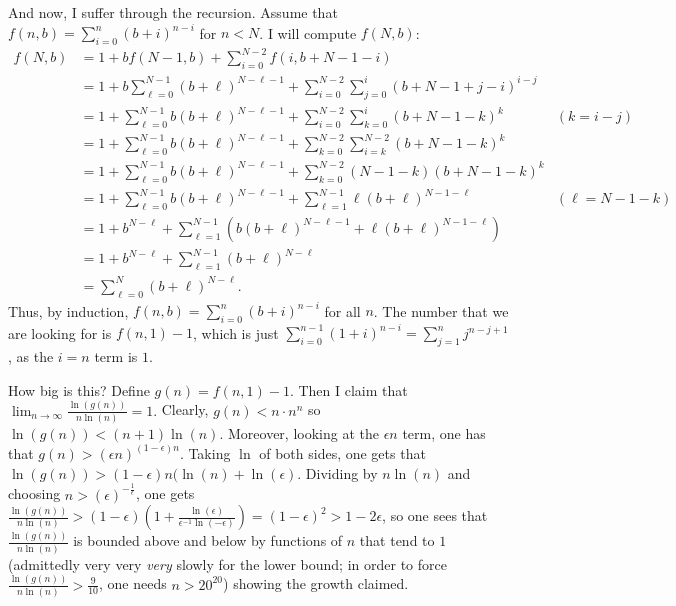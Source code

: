 \documentclass[11pt]{article}
\theoremstyle{definition}
\begin{document}
And now, I suffer through the recursion.  Assume that $f(n, b) = \displaystyle{\sum_{i = 0}^{n}} (b+i)^{n-i}$ for $n < N$.  I will compute $f(N, b)$:
\begin{align*}
f(N, b) & = 1 + bf(N-1, b) + \sum_{i = 0}^{N-2} f(i, b+N-1-i) \\
& = 1 + b\sum_{\ell = 0}^{N-1}(b+\ell)^{N-\ell-1} + \sum_{i = 0}^{N-2} \sum_{j = 0}^{i}(b+N-1+j-i)^{i-j} \\
& = 1 + \sum_{\ell = 0}^{N-1}b(b+\ell)^{N-\ell-1} + \sum_{i = 0}^{N-2} \sum_{k = 0}^{i}(b+N-1-k)^{k} & (k = i-j) \\
& = 1 + \sum_{\ell = 0}^{N-1}b(b+\ell)^{N-\ell-1} + \sum_{k = 0}^{N-2} \sum_{i = k}^{N-2}(b+N-1-k)^{k} \\
& = 1 + \sum_{\ell = 0}^{N-1}b(b+\ell)^{N-\ell-1} + \sum_{k = 0}^{N-2} (N-1-k)(b+N-1-k)^{k} \\
& = 1 + \sum_{\ell = 0}^{N-1}b(b+\ell)^{N-\ell-1} + \sum_{\ell = 1}^{N-1} \ell(b+\ell)^{N-1-\ell} & (\ell = N-1-k)\\
& = 1 + b^{N-\ell} +\sum_{\ell = 1}^{N-1}\left(b(b+\ell)^{N-\ell-1} + \ell(b+\ell)^{N-1-\ell}\right) \\
& = 1 + b^{N-\ell} +\sum_{\ell = 1}^{N-1}(b+\ell)^{N-\ell} \\
& = \sum_{\ell = 0}^{N}(b+\ell)^{N-\ell}.
\end{align*}
Thus, by induction, $f(n, b) = \displaystyle{\sum_{i = 0}^{n}} (b+i)^{n-i}$ for all $n$.  The number that we are looking for is $f(n, 1)-1$, which is just $\displaystyle{\sum_{i = 0}^{n-1}} (1+i)^{n-i} = \displaystyle{\sum_{j = 1}^{n}} j^{n-j+1}$, as the $i = n$ term is $1$.

How big is this?  Define $g(n) = f(n, 1) -1$.  Then I claim that $\displaystyle{\lim_{n\rightarrow\infty}\frac{\ln(g(n))}{n\ln(n)} = 1}.$  Clearly, $g(n) < n\cdot n^n$ so $\ln(g(n)) < (n+1)\ln(n)$.  Moreover, looking at the $\epsilon n$ term, one has that $g(n) > (\epsilon n)^{(1-\epsilon)n}$.  Taking $\ln$ of both sides, one gets that $\ln(g(n)) > (1-\epsilon)n(\ln(n) + \ln(\epsilon)$.  Dividing by $n \ln(n)$ and choosing $n > (\epsilon)^{-\frac{1}{\epsilon}}$, one gets $\frac{\ln(g(n))}{n\ln(n)} > (1-\epsilon)(1 + \frac{\ln(\epsilon)}{\epsilon^{-1}\ln(-\epsilon)}) = (1-\epsilon)^2 > 1-2\epsilon$, so one sees that $\frac{\ln(g(n))}{n\ln(n)}$ is bounded above and below by functions of $n$ that tend to $1$ (admittedly very very \emph{very} slowly for the lower bound; in order to force $\frac{\ln(g(n))}{n\ln(n)} > \frac{9}{10}$, one needs $n > 20^{20}$) showing the growth claimed.
\end{document}
